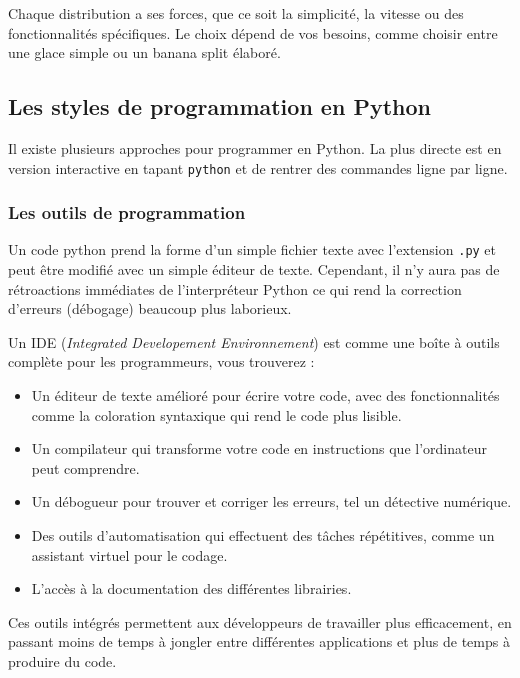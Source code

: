 \documentclass[11pt]{article}
\begin{document}
Chaque distribution a ses forces, que ce soit la simplicité, la vitesse
ou des fonctionnalités spécifiques. Le choix dépend de vos besoins,
comme choisir entre une glace simple ou un banana split élaboré.

\hypertarget{les-styles-de-programmation-en-python}{%
\subsection{Les styles de programmation en
Python}\label{les-styles-de-programmation-en-python}}

Il existe plusieurs approches pour programmer en Python. La plus directe
est en version interactive en tapant \texttt{python} et de rentrer des
commandes ligne par ligne.

\hypertarget{les-outils-de-programmation}{%
\subsubsection{Les outils de
programmation}\label{les-outils-de-programmation}}

Un code python prend la forme d'un simple fichier texte avec l'extension
\texttt{.py} et peut être modifié avec un simple éditeur de texte.
Cependant, il n'y aura pas de rétroactions immédiates de l'interpréteur
Python ce qui rend la correction d'erreurs (débogage) beaucoup plus
laborieux.

Un IDE (\emph{Integrated Developement Environnement}) est comme une
boîte à outils complète pour les programmeurs, vous trouverez :

\begin{itemize}
\item
  Un éditeur de texte amélioré pour écrire votre code, avec des
  fonctionnalités comme la coloration syntaxique qui rend le code plus
  lisible.
\item
  Un compilateur qui transforme votre code en instructions que
  l'ordinateur peut comprendre.
\item
  Un débogueur pour trouver et corriger les erreurs, tel un détective
  numérique.
\item
  Des outils d'automatisation qui effectuent des tâches répétitives,
  comme un assistant virtuel pour le codage.
\item
  L'accès à la documentation des différentes librairies.
\end{itemize}

Ces outils intégrés permettent aux développeurs de travailler plus
efficacement, en passant moins de temps à jongler entre différentes
applications et plus de temps à produire du code.
\end{document}
